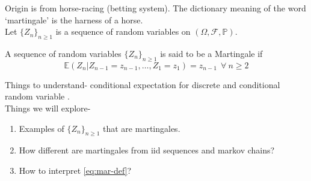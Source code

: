 \documentclass[main]{subfiles}
\begin{document}


Origin is from horse-racing (betting system). The dictionary meaning of the word `martingale' is the harness of a horse. \\
Let $\{Z_n\}_{n \geq 1}$ is a sequence of random variables on $(\Omega, \mathcal{F}, \mathbb{P})$. \\
\begin{definition} A sequence of random variables $\{Z_n\}_{n \geq 1}$ is said to be a Martingale if
    \begin{equation} \label{eq:mar-def}
        \mathbb{E} (Z_{n}|Z_{n-1}=z_{n-1}, \ldots, Z_1=z_1 )= z_{n-1} ~~\forall ~ n \geq 2
    \end{equation} \end{definition}

Things to understand- conditional expectation for discrete and conditional random variable \cite{AST-2016}.\\
Things we will explore-
\begin{enumerate}
    \item Examples of $\{Z_n\}_{n \geq 1}$ that are martingales.\\
    \item How different are martingales from iid sequences and markov chains? \\
    \item How to interpret \ref{eq:mar-def}?
\end{enumerate}
\end{document}

